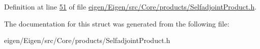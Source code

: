Definition at line \hyperlink{eigen_2_eigen_2src_2_core_2products_2_selfadjoint_product_8h_source_l00051}{51} of file \hyperlink{eigen_2_eigen_2src_2_core_2products_2_selfadjoint_product_8h_source}{eigen/\+Eigen/src/\+Core/products/\+Selfadjoint\+Product.\+h}.



The documentation for this struct was generated from the following file\+:\begin{DoxyCompactItemize}
\item 
eigen/\+Eigen/src/\+Core/products/\+Selfadjoint\+Product.\+h\end{DoxyCompactItemize}
